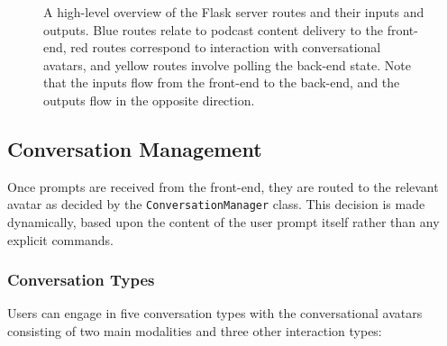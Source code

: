 \documentclass[12pt]{report}
\begin{document}
\begin{myfont}
\begin{figure}[H]
{}
            \caption{A high-level overview of the Flask server routes and their inputs and outputs. Blue routes relate to podcast content delivery to the front-end, red routes correspond to interaction with conversational avatars, and yellow routes involve polling the back-end state. Note that the inputs flow from the front-end to the back-end, and the outputs flow in the opposite direction.}
            \label{fig:flaskroutes}
        \end{figure}
        
        \subsection{Conversation Management}
        \indent Once prompts are received from the front-end, they are routed to the relevant avatar as decided by the \texttt{ConversationManager} class. This decision is made dynamically, based upon the content of the user prompt itself rather than any explicit commands.
        
        \subsubsection{Conversation Types}
        \indent Users can engage in five conversation types with the conversational avatars consisting of two main modalities and three other interaction types: 


\end{myfont}
\end{document}
